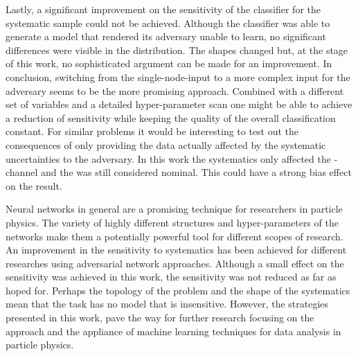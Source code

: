 Lastly, a significant improvement on the sensitivity of the classifier for the systematic sample could not be achieved. Although the classifier was able to generate a model that rendered its adversary unable to learn, no significant differences were visible in the distribution. The shapes changed but, at the stage of this work, no sophisticated argument can be made for an improvement. In conclusion, switching from the single-node-input to a more complex input for the adversary seems to be the more promising approach. Combined with a different set of variables and a detailed hyper-parameter scan one might be able to achieve a reduction of sensitivity while keeping the quality of the overall classification constant.
For similar problems it would be interesting to test out the consequences of only providing the data actually affected by the systematic uncertainties to the adversary. In this work the systematics only affected the \tW-channel and the \ttbar was still considered nominal. This could have a strong bias effect on the result.

Neural networks in general are a promising technique for researchers in particle physics. The variety of highly different structures and hyper-parameters of the networks make them a potentially powerful tool for different scopes of research. An improvement in the sensitivity to systematics has been achieved for different researches using adversarial network approaches. Although a small effect on the sensitivity was achieved in this work, the sensitivity was not reduced as far as hoped for. Perhaps the topology of the problem and the shape of the systematics mean that the task has no model that is insensitive. However, the strategies presented in this work, pave the way for further research focusing on the approach and the appliance of machine learning techniques for data analysis in particle physics.

